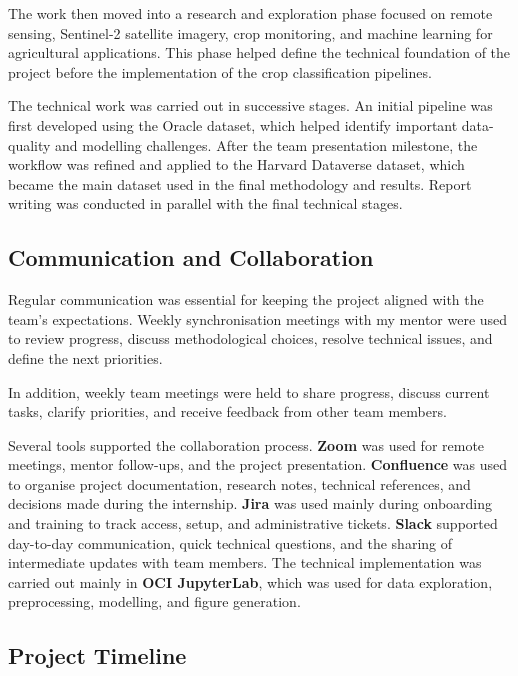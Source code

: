 The work then moved into a research and exploration phase focused on remote
sensing, Sentinel-2 satellite imagery, crop monitoring, and machine learning
for agricultural applications. This phase helped define the technical
foundation of the project before the implementation of the crop classification
pipelines.

The technical work was carried out in successive stages. An initial pipeline
was first developed using the Oracle dataset, which helped identify important
data-quality and modelling challenges. After the team presentation milestone,
the workflow was refined and applied to the Harvard Dataverse dataset, which
became the main dataset used in the final methodology and results. Report
writing was conducted in parallel with the final technical stages.

\subsection{Communication and Collaboration}
\label{subsec:communication_collaboration}

Regular communication was essential for keeping the project aligned with the
team's expectations. Weekly synchronisation meetings with my mentor were used
to review progress, discuss methodological choices, resolve technical issues,
and define the next priorities.

In addition, weekly team meetings were held to share progress, discuss current
tasks, clarify priorities, and receive feedback from other team members.

Several tools supported the collaboration process. \textbf{Zoom} was used for
remote meetings, mentor follow-ups, and the project presentation.
\textbf{Confluence} was used to organise project documentation, research notes,
technical references, and decisions made during the internship.
\textbf{Jira} was used mainly during onboarding and training to track access,
setup, and administrative tickets. \textbf{Slack} supported day-to-day
communication, quick technical questions, and the sharing of intermediate
updates with team members. The technical implementation was carried out mainly
in \textbf{OCI JupyterLab}, which was used for data exploration,
preprocessing, modelling, and figure generation.

\subsection{Project Timeline}
\label{subsec:project_timeline}

